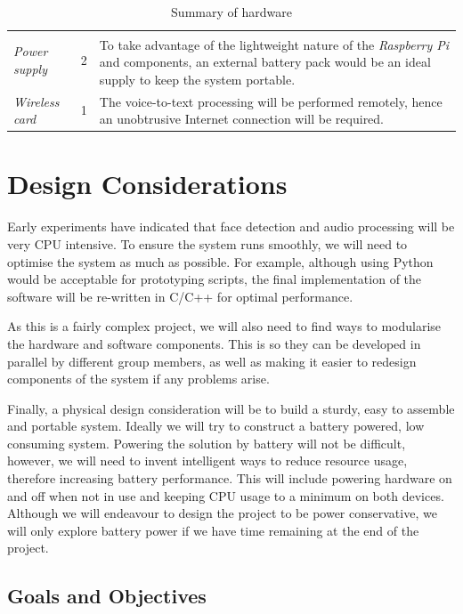 \documentclass[11pt,a4paper,titlepage]{report}
\newcommand{\rpi}{\textit{Raspberry Pi\textsuperscript{\textregistered}}}
\begin{document}
\begin{center}
\begin{table}
{\begin{tabu}{ lcp{7cm} }
    \textit{Power supply} & 2 & To take advantage of the lightweight nature of the \rpi\xspace and components, an external battery pack would be an ideal supply to keep the system portable.\\ 


    \textit{Wireless card} & 1 & The voice-to-text processing will be performed remotely, hence an unobtrusive Internet connection will be required.\\ \hline
    
\end{tabu} }
\caption{Summary of hardware}
\label{table:hardwaretable}
\end{table}

\end{center}

\section{Design Considerations}

Early experiments have indicated that face detection and audio processing will be very CPU intensive. To ensure the system runs smoothly, we will need to optimise the system as much as possible. For example, although using Python would be acceptable for prototyping scripts, the final implementation of the software will be re-written in C/C++ for optimal performance.

As this is a fairly complex project, we will also need to find ways to modularise the hardware and software components. This is so they can be developed in parallel by different group members, as well as making it easier to redesign components of the system if any problems arise.

Finally, a physical design consideration will be to build a sturdy, easy to assemble and portable system. Ideally we will try to construct a battery powered, low consuming system. Powering the solution by battery will not be difficult, however, we will need to invent intelligent ways to reduce resource usage, therefore increasing battery performance. This will include powering hardware on and off when not in use and keeping CPU usage to a minimum on both devices. Although we will endeavour to design the project to be power conservative, we will only explore  battery power if we have time remaining at the end of the project. 


\subsection{Goals and Objectives}
\end{document}
